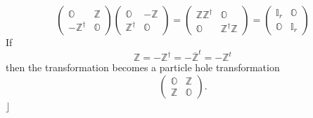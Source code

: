 \documentclass[aps, preprint]{revtex4}
\begin{document}
\begin{equation}\left (\begin{array}{cc}\mathbb{O} & \mathbb{Z} \\
 -\mathbb{Z}^{ \dag } & \mathbb{O}\end{array}\right ) \left (\begin{array}{cc}\mathbb{O} &  -\mathbb{Z} \\
\mathbb{Z}^{ \dag } & \mathbb{O}\end{array}\right ) =\left (\begin{array}{cc}\mathbb{Z} \mathbb{Z}^{ \dag } & \mathbb{O} \\
\mathbb{O} & \mathbb{Z}^{ \dag } \mathbb{Z}\end{array}\right ) =\left (\begin{array}{cc}\mathbb{I}_{r} & \mathbb{O} \\
\mathbb{O} & \mathbb{I}_{r}\end{array}\right )
\end{equation}If
\begin{equation}\mathbb{Z} = -\mathbb{Z}^{ \dag } = -\overline{\mathbb{Z}}^{t} = -\mathbb{Z}^{t}
\end{equation}then the transformation becomes a particle hole transformation
\begin{equation}\left (\begin{array}{cc}\mathbb{O} & \mathbb{Z} \\
\mathbb{Z} & \mathbb{O}\end{array}\right )\text{.}
\end{equation}$\rfloor $ 
\end{document}
